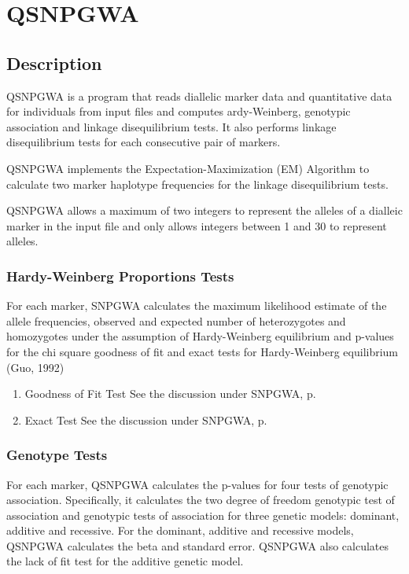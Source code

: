
\section{QSNPGWA}
\label{sec:qsnpgwa}
\subsection{Description}

QSNPGWA is a program that reads diallelic marker data and quantitative data for
individuals from input files and computes ardy-Weinberg, genotypic association
and linkage disequilibrium tests.  It also performs linkage disequilibrium tests
for each consecutive pair of markers.

QSNPGWA implements the Expectation-Maximization (EM) Algorithm to calculate two
marker haplotype frequencies for the linkage disequilibrium tests.

QSNPGWA allows a maximum of two integers to represent the alleles of a dialleic
marker in the input file and only allows integers between 1 and 30 to represent
alleles.

\subsubsection{Hardy-Weinberg Proportions Tests}

For each marker, SNPGWA calculates the maximum likelihood estimate of the allele
frequencies, observed and expected number of heterozygotes and homozygotes under
the assumption of Hardy-Weinberg equilibrium and p-values for the chi square
goodness of fit and exact tests for Hardy-Weinberg equilibrium (Guo, 1992)

\begin{enumerate}

\item{Goodness of Fit Test}
See the discussion under SNPGWA, p.\pageref{goodness-of-fit}

\item{Exact Test}
See the discussion under SNPGWA, p.\pageref{exact-test}

\end{enumerate}

\subsubsection{Genotype Tests}
For each marker, QSNPGWA calculates the p-values for four tests of genotypic
association.  Specifically, it calculates the two degree of freedom genotypic
test of association and genotypic tests of association for three genetic models:
dominant, additive and recessive.  For the dominant, additive and recessive
models, QSNPGWA calculates the beta and standard error.  QSNPGWA also calculates
the lack of fit test for the additive genetic model.


